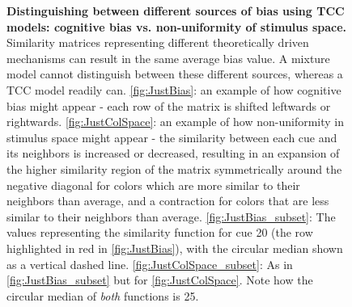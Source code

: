 \begin{figure}
        \caption{\textbf{Distinguishing between different sources of bias using TCC models: cognitive bias vs. non-uniformity of stimulus space.} Similarity matrices representing different theoretically driven mechanisms can result in the same average bias value. A mixture model cannot distinguish between these different sources, whereas a TCC model readily can. \ref{fig:JustBias}: an example of how cognitive bias might appear - each row of the matrix is shifted leftwards or rightwards. \ref{fig:JustColSpace}: an example of how non-uniformity in stimulus space might appear - the similarity between each cue and its neighbors is increased or decreased, resulting in an expansion of the higher similarity region of the matrix symmetrically around the negative diagonal for colors which are more similar to their neighbors than average, and a contraction for colors that are less similar to their neighbors than average. \ref{fig:JustBias_subset}: The values representing the similarity function for cue 20 (the row highlighted in red in \ref{fig:JustBias}), with the circular median shown as a vertical dashed line. \ref{fig:JustColSpace_subset}: As in \ref{fig:JustBias_subset} but for \ref{fig:JustColSpace}. Note how the circular median of \emph{both} functions is 25.}
        \label{fig:TCCDemo}
\end{figure}


